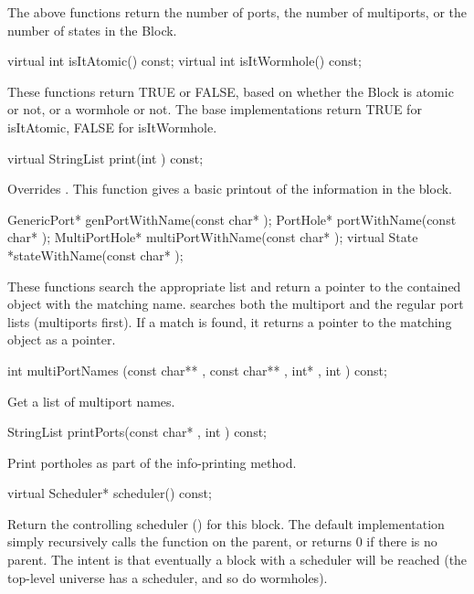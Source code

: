 The above functions return the number of ports, the number of
multiports, or the number of states in the Block.

\begin{example}
virtual int isItAtomic() const;
virtual int isItWormhole() const;
\end{example}

These functions return TRUE or FALSE, based on whether the Block is
atomic or not, or a wormhole or not.  The base implementations return
TRUE for isItAtomic, FALSE for isItWormhole.

\begin{example}
virtual StringList print(int ) const;
\end{example}

Overrides .  This function gives a basic printout of
the information in the block.

\begin{example}
GenericPort* genPortWithName(const char* );
PortHole* portWithName(const char* );
MultiPortHole* multiPortWithName(const char* );
virtual State *stateWithName(const char* );
\end{example}

These functions search the appropriate list and return a pointer
to the contained object with the matching name.  
searches both the multiport and the regular port lists (multiports
first).  If a match is found, it returns a pointer to the matching
object as a  pointer.

\begin{example}
int multiPortNames (const char** , const char** ,
                    int* , int ) const;
\end{example}

Get a list of multiport names.

\begin{example}
StringList printPorts(const char* , int ) const;
\end{example}

Print portholes as part of the info-printing method.

\begin{example}
virtual Scheduler* scheduler() const;
\end{example}

Return the controlling scheduler ()
for this block.  The default
implementation simply recursively calls the  function on the parent, or returns 0
if there is no parent.  The intent is that eventually a block with
a scheduler will be reached (the top-level universe has a scheduler,
and so do wormholes).

